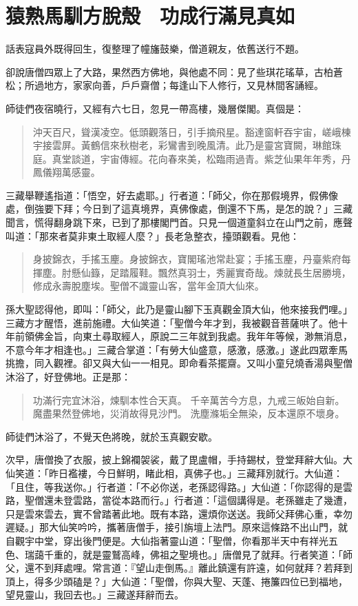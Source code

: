 
\chapter{猿熟馬馴方脫殼　功成行滿見真如}

話表寇員外既得回生，復整理了幢旛鼓樂，僧道親友，依舊送行不題。

卻說唐僧四眾上了大路，果然西方佛地，與他處不同：見了些琪花瑤草，古柏蒼松；所過地方，家家向善，戶戶齋僧；每逢山下人修行，又見林間客誦經。

師徒們夜宿曉行，又經有六七日，忽見一帶高樓，幾層傑閣。真個是：
\begin{quote}
沖天百尺，聳漢凌空。低頭觀落日，引手摘飛星。豁達窗軒吞宇宙，嵯峨棟宇接雲屏。黃鶴信來秋樹老，彩鸞書到晚風清。此乃是靈宮寶闕，琳館珠庭。真堂談道，宇宙傳經。花向春來美，松臨雨過青。紫芝仙果年年秀，丹鳳儀翔萬感靈。
\end{quote}

三藏舉鞭遙指道：「悟空，好去處耶。」行者道：「師父，你在那假境界，假佛像處，倒強要下拜；今日到了這真境界，真佛像處，倒還不下馬，是怎的說？」三藏聞言，慌得翻身跳下來，已到了那樓閣門首。只見一個道童斜立在山門之前，應聲叫道：「那來者莫非東土取經人麼？」長老急整衣，擡頭觀看。見他：
\begin{quote}
身披錦衣，手搖玉麈。身披錦衣，寶閣瑤池常赴宴；手搖玉麈，丹臺紫府每揮塵。肘懸仙籙，足踏履鞋。飄然真羽士，秀麗實奇哉。煉就長生居勝境，修成永壽脫塵埃。聖僧不識靈山客，當年金頂大仙來。
\end{quote}

孫大聖認得他，即叫：「師父，此乃是靈山腳下玉真觀金頂大仙，他來接我們哩。」三藏方才醒悟，進前施禮。大仙笑道：「聖僧今年才到，我被觀音菩薩哄了。他十年前領佛金旨，向東土尋取經人，原說二三年就到我處。我年年等候，渺無消息，不意今年才相逢也。」三藏合掌道：「有勞大仙盛意，感激，感激。」遂此四眾牽馬挑擔，同入觀裡。卻又與大仙一一相見。即命看茶擺齋。又叫小童兒燒香湯與聖僧沐浴了，好登佛地。正是那：
\begin{quote}
功滿行完宜沐浴，煉馴本性合天真。
千辛萬苦今方息，九戒三皈始自新。
魔盡果然登佛地，災消故得見沙門。
洗塵滌垢全無染，反本還原不壞身。
\end{quote}

師徒們沐浴了，不覺天色將晚，就於玉真觀安歇。

次早，唐僧換了衣服，披上錦襴袈裟，戴了毘盧帽，手持錫杖，登堂拜辭大仙。大仙笑道：「昨日襤褸，今日鮮明，睹此相，真佛子也。」三藏拜別就行。大仙道：「且住，等我送你。」行者道：「不必你送，老孫認得路。」大仙道：「你認得的是雲路，聖僧還未登雲路，當從本路而行。」行者道：「這個講得是。老孫雖走了幾遭，只是雲來雲去，實不曾踏著此地。既有本路，還煩你送送。我師父拜佛心重，幸勿遲疑。」那大仙笑吟吟，攜著唐僧手，接引旃壇上法門。原來這條路不出山門，就自觀宇中堂，穿出後門便是。大仙指著靈山道：「聖僧，你看那半天中有祥光五色、瑞藹千重的，就是靈鷲高峰，佛祖之聖境也。」唐僧見了就拜。行者笑道：「師父，還不到拜處哩。常言道：『望山走倒馬。』離此鎮還有許遠，如何就拜？若拜到頂上，得多少頭磕是？」大仙道：「聖僧，你與大聖、天蓬、捲簾四位已到福地，望見靈山，我回去也。」三藏遂拜辭而去。

